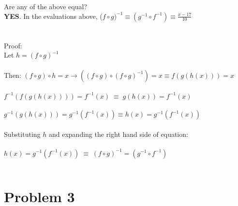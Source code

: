 \documentclass{amsart}
\theoremstyle{definition}
\theoremstyle{Exercise}
\theoremstyle{remark}
\theoremstyle{rule}
\numberwithin{equation}{section}
\begin{document}
Are any of the above equal?\\
\textbf{YES}. In the evaluations above, ($f \circ g)^{-1} \equiv (g^{-1} \circ f^{-1}) \equiv \frac{x-17}{10}$\\
\\\\
Proof:\\
Let $h = (f \circ g)^{-1}$\\\\
Then: $(f \circ g) \circ h = x \rightarrow ((f \circ g)\circ(f \circ g)^{-1}) = x \equiv f(g(h(x)))=x$\\\\
$f^{-1}(f(g(h(x))))= f^{-1}(x)\; \equiv\; g(h(x)) = f^{-1}(x)$\\\\
$g^{-1}(g(h(x))) = g^{-1}(f^{-1}(x)) \equiv h(x) = g^{-1}(f^{-1}(x))$\\\\
Substituting $h$ and expanding the right hand side of equation:\\\\
$h(x) = g^{-1}(f^{-1}(x))\; \equiv\; (f \circ g)^{-1} = (g^{-1} \circ f^{-1})$
\\\\


    \newpage


\vspace*{0.25in}
\section*{Problem 3}
\end{document}
